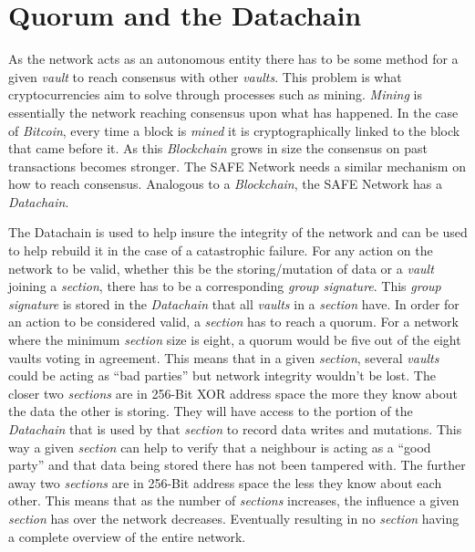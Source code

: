 \section{Quorum and the Datachain}
\label{sec:datachain}

As the network acts as an autonomous entity there has to be some method for a given \textit{vault} to reach consensus with other \textit{vaults}. This problem is what cryptocurrencies aim to solve through processes such as mining. \textit{Mining} is essentially the network reaching consensus upon what has happened. In the case of \textit{Bitcoin}, every time a block is \textit{mined} it is cryptographically linked to the block that came before it. As this \textit{Blockchain} grows in size the consensus on past transactions becomes stronger. The SAFE Network needs a similar mechanism on how to reach consensus. Analogous to a \textit{Blockchain}, the SAFE Network has a \textit{Datachain}.

The Datachain is used to help insure the integrity of the network and can be used to help rebuild it in the case of a catastrophic failure. For any action on the network to be valid, whether this be the storing/mutation of data or a \textit{vault} joining a \textit{section}, there has to be a corresponding \textit{group signature}. This \textit{group signature} is stored in the \textit{Datachain} that all \textit{vaults} in a \textit{section} have. In order for an action to be considered valid, a \textit{section} has to reach a quorum. For a network where the minimum \textit{section} size is eight, a quorum would be five out of the eight vaults voting in agreement. This means that in a given \textit{section}, several \textit{vaults} could be acting as ``bad parties'' but network integrity wouldn't be lost. The closer two \textit{sections} are in 256-Bit XOR address space the more they know about the data the other is storing. They will have access to the portion of the \textit{Datachain} that is used by that \textit{section} to record data writes and mutations. This way a given \textit{section} can help to verify that a neighbour is acting as a ``good party'' and that data being stored there has not been tampered with. The further away two \textit{sections} are in 256-Bit address space the less they know about each other. This means that as the number of \textit{sections} increases, the influence a given \textit{section} has over the network decreases. Eventually resulting in no \textit{section} having a complete overview of the entire network.

